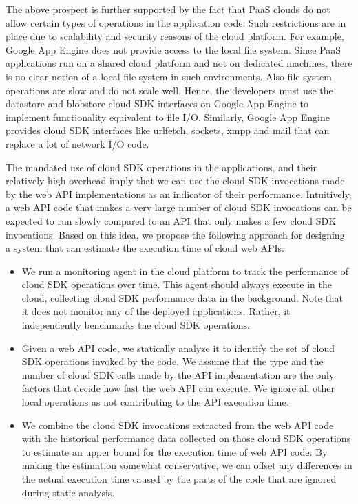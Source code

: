 The above prospect is further supported by the fact that PaaS clouds do not allow 
certain types of operations in the application code. Such restrictions are in place
due to scalability and security reasons of the cloud platform. For example, Google App Engine
does not provide access to the local file system. Since PaaS applications run on a shared cloud
platform and not on dedicated machines, there is no clear notion of a local file system in such environments.
Also file system operations are slow and do not scale well.
Hence, the developers must use the datastore and blobstore cloud SDK interfaces on Google App
Engine to implement functionality equivalent to file I/O. Similarly, Google App Engine provides cloud SDK
interfaces like urlfetch, sockets, xmpp and mail that can replace a lot of network I/O code.

The mandated use of cloud SDK operations in the applications, and their relatively high overhead 
imply that we can use the cloud SDK
invocations made by the web API implementations as an indicator of their performance. Intuitively, a web API
code that makes a very large number of cloud SDK invocations can be expected to run slowly compared
to an API that only makes a few cloud SDK invocations. Based on this idea, we propose the following approach
for designing a system that can estimate the execution time of cloud web APIs:

\begin{itemize}
\item We run a monitoring agent in the cloud platform to track the performance of
cloud SDK operations over time. This agent should always execute in the cloud, collecting
cloud SDK performance data in the background. Note that it does not monitor any of the
deployed applications. Rather, it independently benchmarks the cloud SDK operations.
\item Given a web API code, we statically analyze it to identify the set of cloud SDK operations
invoked by the code. We assume that the type and the number of cloud SDK calls made by the API implementation
are the only factors that decide how fast the web API can execute. We ignore all other local operations
as not contributing to the API execution time.
\item We combine the cloud SDK invocations extracted from the web API code with the historical
performance data collected on those cloud SDK operations to estimate an upper bound for the
execution time of web API code. By making the estimation somewhat conservative, we can offset 
any differences in the actual execution time caused by the parts of the code that are ignored during
static analysis. 
\end{itemize}

